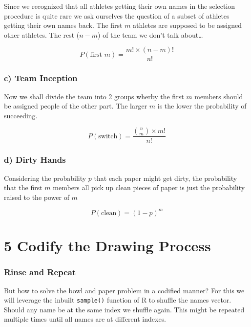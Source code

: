 \documentclass[
]{article}
\begin{document}
Since we recognized that all athletes getting their own names in the
selection procedure is quite rare we ask ourselves the question of a
subset of athletes getting their own names back. The first \(m\)
athletes are supposed to be assigned other athletes. The rest (\(n-m\))
of the team we don't talk about\ldots{}

\[
P(\text{first } m) = \frac{m! \times (n-m)!}{n!}
\]

\subsubsection{c) Team Inception}\label{c-team-inception}

Now we shall divide the team into 2 groups wherby the first \(m\)
members should be assigned people of the other part. The larger \(m\) is
the lower the probability of succeeding.

\[
P(\text{switch}) = \frac{\binom{n}{m} \times m!}{n!}
\]

\subsubsection{d) Dirty Hands}\label{d-dirty-hands}

Considering the probability \(p\) that each paper might get dirty, the
probability that the first \(m\) members all pick up clean pieces of
paper is just the probability raised to the power of \(m\)

\[
P(\text{clean}) = (1-p)^m
\]

\section{5 Codify the Drawing Process}\label{codify-the-drawing-process}

\subsubsection{Rinse and Repeat}\label{rinse-and-repeat}

But how to solve the bowl and paper problem in a codified manner? For
this we will leverage the inbuilt \texttt{sample()} function of R to
shuffle the names vector. Should any name be at the same index we
shuffle again. This might be repeated multiple times until all names are
at different indexes.
\end{document}
